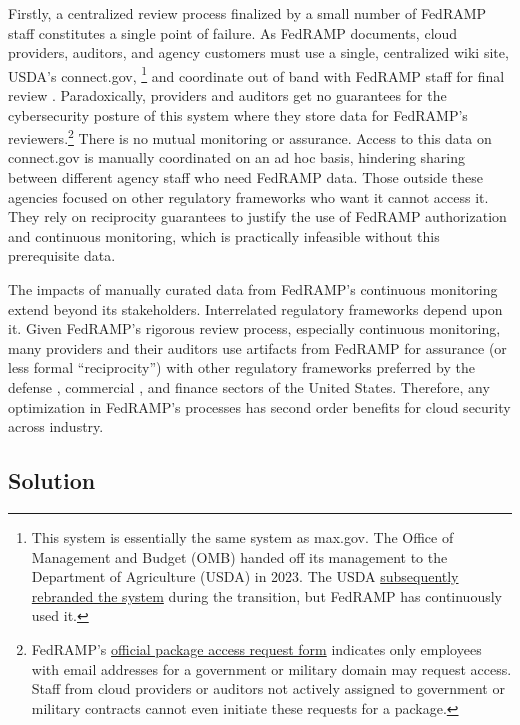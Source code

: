 \documentclass{jdf}
\begin{document}
Firstly, a centralized review process finalized by a small number of FedRAMP staff constitutes a single point of failure. As FedRAMP documents, cloud providers, auditors, and agency customers must use a single, centralized wiki site, USDA's connect.gov, \footnote{This system is essentially the same system as max.gov. The Office of Management and Budget (OMB) handed off its management to the Department of Agriculture (USDA) in 2023. The USDA \href{https://web.archive.org/web/20250617003410/https://www.fedramp.gov/2023-11-13-usda-connect-update-to-fedramp-stakeholders/}{subsequently rebranded the system} during the transition, but FedRAMP has continuously used it.} and coordinate out of band with FedRAMP staff for final review \citeyear[pp.~3,14]{fedramp_auth_playbook25}. Paradoxically, providers and auditors get no guarantees for the cybersecurity posture of this system where they store data for FedRAMP's reviewers.\footnote{FedRAMP's \href{https://web.archive.org/web/20250710063213/https://www.fedramp.gov/assets/resources/documents/Agency_Package_Request_Form.pdf}{official package access request form} indicates only employees with email addresses for a government or military domain may request access. Staff from cloud providers or auditors not actively assigned to government or military contracts cannot even initiate these requests for a package.} There is no mutual monitoring or assurance. Access to this data on connect.gov is manually coordinated on an ad hoc basis, hindering sharing between different agency staff who need FedRAMP data. Those outside these agencies focused on other regulatory frameworks who want it cannot access it. They rely on reciprocity guarantees to justify the use of FedRAMP authorization and continuous monitoring, which is practically infeasible without this prerequisite data.

The impacts of manually curated data from FedRAMP's continuous monitoring extend beyond its stakeholders. Interrelated regulatory frameworks depend upon it. Given FedRAMP's rigorous review process, especially continuous monitoring, many providers and their auditors use artifacts from FedRAMP for assurance (or less formal ``reciprocity'') with other regulatory frameworks preferred by the defense \cite{dod_fedramp_memo23}, commercial \cite{orock21}, and finance sectors of the United States. Therefore, any optimization in FedRAMP's processes has second order benefits for cloud security across industry.

\subsection{Solution}
\end{document}
